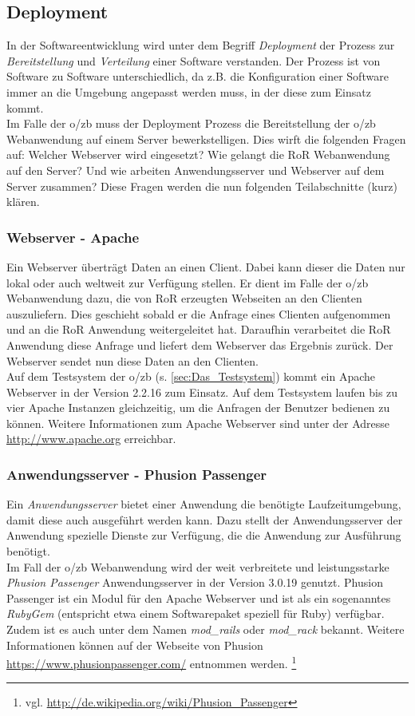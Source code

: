 \documentclass[12pt,             %
               a4paper,          %
               listof=totoc,     %
               index=totoc,      %
               bibliography=totoc,%
               oneside,         %
               BCOR1cm,          %
               english   %
               ]{scrbook}
\begin{document}
\subsection{Deployment}
In der Softwareentwicklung wird unter dem Begriff \textit{Deployment} der Prozess zur \textit{Bereitstellung} und \textit{Verteilung} einer Software verstanden. Der Prozess ist von Software zu Software unterschiedlich, da z.B. die Konfiguration einer Software immer an die Umgebung angepasst werden muss, in der diese zum Einsatz kommt.\\

Im Falle der o/zb muss der Deployment Prozess die Bereitstellung der o/zb Webanwendung auf einem Server bewerkstelligen. Dies wirft die folgenden Fragen auf: Welcher Webserver wird eingesetzt? Wie gelangt die RoR Webanwendung auf den Server? Und wie arbeiten Anwendungsserver und Webserver auf dem Server zusammen? Diese Fragen werden die nun folgenden Teilabschnitte (kurz) klären.

\subsubsection{Webserver - Apache}
Ein Webserver überträgt Daten an einen Client. Dabei kann dieser die Daten nur lokal oder auch weltweit zur Verfügung stellen. Er dient im Falle der o/zb Webanwendung dazu, die von RoR erzeugten Webseiten an den Clienten auszuliefern. Dies geschieht sobald er die Anfrage eines Clienten aufgenommen und an die RoR Anwendung weitergeleitet hat. Daraufhin verarbeitet die RoR Anwendung diese Anfrage und liefert dem Webserver das Ergebnis zurück. Der Webserver sendet nun diese Daten an den Clienten.\\

Auf dem Testsystem der o/zb (s. \vref{sec:Das_Testsystem}) kommt ein Apache Webserver in der Version 2.2.16 zum Einsatz. Auf dem Testsystem laufen bis zu vier Apache Instanzen gleichzeitig, um die Anfragen der Benutzer bedienen zu können. Weitere Informationen zum Apache Webserver sind unter der Adresse \url{http://www.apache.org} erreichbar.

\subsubsection{Anwendungsserver - Phusion Passenger}
Ein \textit{Anwendungsserver} bietet einer Anwendung die benötigte Laufzeitumgebung, damit diese auch ausgeführt werden kann. Dazu stellt der Anwendungsserver der Anwendung spezielle Dienste zur Verfügung, die die Anwendung zur Ausführung benötigt.\\
Im Fall der o/zb Webanwendung wird der weit verbreitete und leistungsstarke \textit{Phusion Passenger} Anwendungsserver in der Version 3.0.19 genutzt. Phusion Passenger ist ein Modul für den Apache Webserver und ist als ein sogenanntes \textit{RubyGem} (entspricht etwa einem Softwarepaket speziell für Ruby) verfügbar. Zudem ist es auch unter dem Namen \textit{mod\_rails} oder \textit{mod\_rack} bekannt. Weitere Informationen können auf der Webseite von Phusion \url{https://www.phusionpassenger.com/} entnommen werden. \footnote{vgl. \url{http://de.wikipedia.org/wiki/Phusion_Passenger}}
\end{document}
